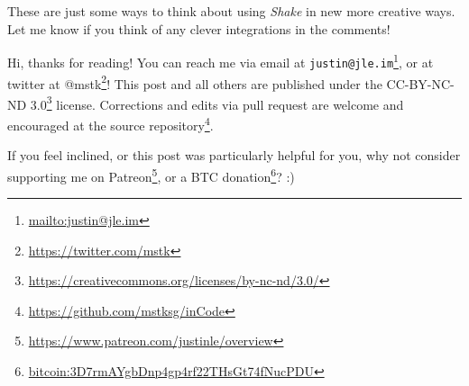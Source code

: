\documentclass[]{article}
\renewcommand{\href}[2]{#2\footnote{\url{#1}}}
\begin{document}
These are just some ways to think about using \emph{Shake} in new more creative
ways. Let me know if you think of any clever integrations in the comments!

Hi, thanks for reading! You can reach me via email at
\href{mailto:justin@jle.im}{\nolinkurl{justin@jle.im}}, or at twitter at
\href{https://twitter.com/mstk}{@mstk}! This post and all others are published
under the \href{https://creativecommons.org/licenses/by-nc-nd/3.0/}{CC-BY-NC-ND
3.0} license. Corrections and edits via pull request are welcome and encouraged
at \href{https://github.com/mstksg/inCode}{the source repository}.

If you feel inclined, or this post was particularly helpful for you, why not
consider \href{https://www.patreon.com/justinle/overview}{supporting me on
Patreon}, or a \href{bitcoin:3D7rmAYgbDnp4gp4rf22THsGt74fNucPDU}{BTC donation}?
:)
\end{document}
